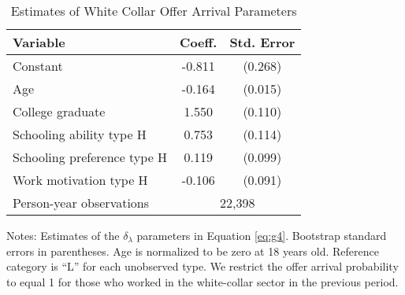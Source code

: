 \begin{table}[ht]
\caption{Estimates of White Collar Offer Arrival Parameters}
\label{tab:OfferEstimates}
\centering
\begin{threeparttable}
\begin{tabular}{lcc}
\toprule
Variable  & Coeff.  & Std. Error \\ 
\midrule
Constant & -0.811 & (0.268) \\ 
 Age & -0.164 & (0.015) \\ 
College graduate & 1.550 & (0.110) \\ 
Schooling ability type H & 0.753 & (0.114) \\ 
Schooling preference type H & 0.119 & (0.099) \\ 
Work motivation type H & -0.106 & (0.091) \\ 
\midrule
Person-year observations & \multicolumn{2}{c}{22,398} \\ 
\bottomrule
\end{tabular}
\footnotesize Notes: Estimates of the $\delta_\lambda$ parameters in Equation \eqref{eq:g4}. Bootstrap standard errors in parentheses. Age is normalized to be zero at 18 years old. Reference category is ``L'' for each unobserved type. We restrict the offer arrival probability to equal 1 for those who worked in the white-collar sector in the previous period.
\end{threeparttable}
\end{table}
